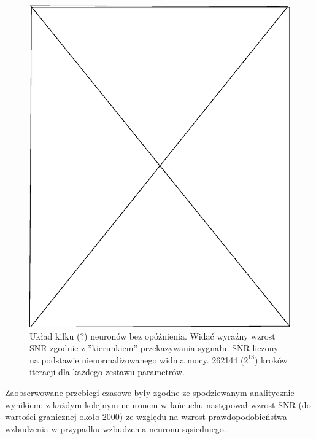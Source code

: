   \begin{figure}
    \includegraphics[width=120mm]{images/pending}
    \caption{Układ kilku (?) neuronów bez opóźnienia. Widać wyraźny wzrost SNR zgodnie z ''kierunkiem'' przekazywania sygnału. SNR liczony na podstawie nienormalizowanego widma mocy. 262144 ($2^{18}$) kroków iteracji dla każdego zestawu parametrów.}
    \label{fig:graphics:sim:x}
  \end{figure}

  Zaobserwowane przebiegi czasowe były zgodne ze spodziewanym analitycznie wynikiem: z każdym kolejnym neuronem w łańcuchu następował wzrost SNR (do wartości granicznej około 2000) ze względu na wzrost prawdopodobieństwa wzbudzenia w przypadku wzbudzenia neuronu sąsiedniego.


